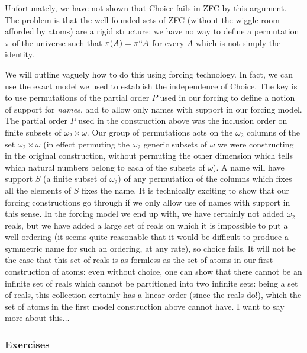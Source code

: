 \documentclass[12pt]{book}
\begin{document}
Unfortunately, we have not shown that Choice fails in ZFC by this argument.  The problem is that the well-founded sets of ZFC (without the wiggle room afforded by atoms) are a rigid structure:  we have no way to define a permutation $\pi$ of the universe such that $\pi(A) = \pi``A$ for every $A$ which is not simply the identity.

We will outline vaguely how to do this using forcing technology.  In fact, we can use the exact model we used to establish the independence of Choice.  The key is to use permutations of the partial order $P$ used in our forcing to define a notion of support for {\em names\/}, and to allow only names with support in our forcing model.  The partial order $P$ used in the construction above was the inclusion order on finite subsets of $\omega_2 \times \omega$.  Our group of permutations acts on the $\omega_2$ columns of the set $\omega_2 \times \omega$ (in effect permuting the $\omega_2$ generic subsets of $\omega$  we were constructing in the original construction, without permuting the other dimension which tells which natural numbers belong to each of the subsets of $\omega$).  A name will have support $S$ (a finite subset of $\omega_2$)
of any permutation of the columns which fixes all the elements of $S$ fixes the name.  It is technically exciting to show that our forcing constructions go through if we only allow use of names with support in this sense.  In the forcing model we end up with, we have certainly not added $\omega_2$ reals, but we have added a large set of reals on which it is impossible to put a well-ordering (it seems quite reasonable that it would be difficult to produce a symmetric name for such an ordering, at any rate), so choice fails.  It will not be the case that this set of reals is as formless as the set of atoms in our first construction of atoms:  even without choice, one can show that there cannot be an infinite set of reals which cannot be partitioned into two infinite sets:  being a set of reals, this collection certainly has a linear order (since the reals do!), which the set of atoms in the first model construction above cannot have.  I want to say more about this$\ldots$

\subsubsection{Exercises}
\end{document}
